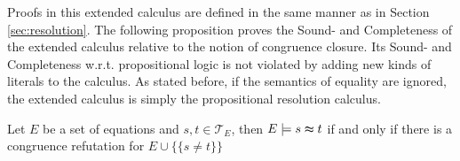 Proofs in this extended calculus are defined in the same manner as in Section \ref{sec:resolution}.
The following proposition proves the Sound- and Completeness of the extended calculus relative to the notion of congruence closure.
Its Sound- and Completeness w.r.t. propositional logic is not violated by adding new kinds of literals to the calculus.
As stated before, if the semantics of equality are ignored, the extended calculus is simply the propositional resolution calculus.

\begin{proposition}

Let $E$ be a set of equations and $s,t \in \mathcal{T}_E$, then $E \models s \thickapprox t$ if and only if there is a congruence refutation for $E \cup \{\{ s \neq t\}\}$

\end{proposition}

